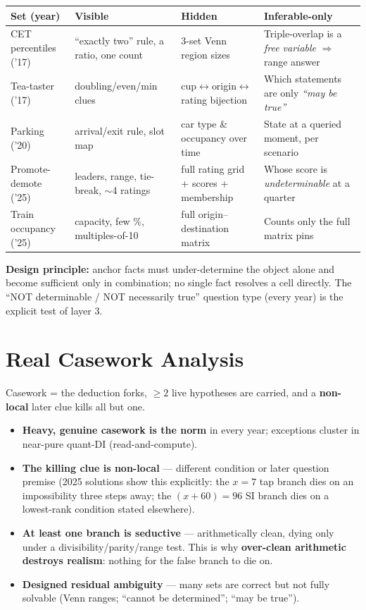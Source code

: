 \documentclass[11pt,a4paper]{article}
\begin{document}
\begin{center}
\begin{tabularx}{\textwidth}{lYYY}
\toprule
\textbf{Set (year)} & \textbf{Visible} & \textbf{Hidden} & \textbf{Inferable-only} \\
\midrule
CET percentiles (’17) & ``exactly two'' rule, a ratio, one count & 3-set Venn region sizes & Triple-overlap is a \emph{free variable} $\Rightarrow$ range answer \\
Tea-taster (’17) & doubling/even/min clues & cup$\leftrightarrow$origin$\leftrightarrow$rating bijection & Which statements are only \emph{``may be true''} \\
Parking (’20) & arrival/exit rule, slot map & car type \& occupancy over time & State at a queried moment, per scenario \\
Promote-demote (’25) & leaders, range, tie-break, $\sim$4 ratings & full rating grid + scores + membership & Whose score is \emph{undeterminable} at a quarter \\
Train occupancy (’25) & capacity, few \%, multiples-of-10 & full origin--destination matrix & Counts only the full matrix pins \\
\bottomrule
\end{tabularx}
\end{center}

\textbf{Design principle:} anchor facts must under-determine the object alone and become sufficient only in combination; no single fact resolves a cell directly. The ``NOT determinable / NOT necessarily true'' question type (every year) is the explicit test of layer 3.

\section{Real Casework Analysis}

Casework = the deduction forks, $\ge2$ live hypotheses are carried, and a \textbf{non-local} later clue kills all but one.

\begin{itemize}[leftmargin=1.4em]
\item \textbf{Heavy, genuine casework is the norm} in every year; exceptions cluster in near-pure quant-DI (read-and-compute).
\item \textbf{The killing clue is non-local} --- different condition or later question premise (2025 solutions show this explicitly: the $x{=}7$ tap branch dies on an impossibility three steps away; the $(x{+}60){=}96$ SI branch dies on a lowest-rank condition stated elsewhere).
\item \textbf{At least one branch is seductive} --- arithmetically clean, dying only under a divisibility/parity/range test. This is why \textbf{over-clean arithmetic destroys realism}: nothing for the false branch to die on.
\item \textbf{Designed residual ambiguity} --- many sets are correct but not fully solvable (Venn ranges; ``cannot be determined''; ``may be true'').
\end{itemize}
\end{document}
